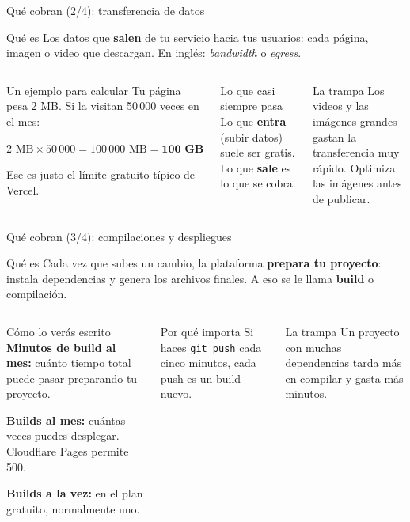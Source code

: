 \documentclass[aspectratio=169,10pt,c]{beamer}
\begin{document}
\begin{frame}{Qué cobran (2/4): transferencia de datos}
\begin{block}{Qué es}
\small Los datos que \textbf{salen} de tu servicio hacia tus usuarios: cada página, imagen o video que descargan. En inglés: \emph{bandwidth} o \emph{egress}.
\end{block}
\begin{columns}[T,onlytextwidth]
\begin{exampleblock}{Un ejemplo para calcular}
\small Tu página pesa 2 MB. Si la visitan 50\,000 veces en el mes:\par\smallskip
$2 \text{ MB} \times 50\,000 = 100\,000 \text{ MB} = \mathbf{100 \text{ GB}}$\par\smallskip
Ese es justo el límite gratuito típico de Vercel.
\end{exampleblock}
\begin{block}{Lo que casi siempre pasa}
\small Lo que \textbf{entra} (subir datos) suele ser gratis. Lo que \textbf{sale} es lo que se cobra.
\end{block}
\begin{alertblock}{La trampa}
\small Los videos y las imágenes grandes gastan la transferencia muy rápido. Optimiza las imágenes antes de publicar.
\end{alertblock}
\end{columns}
\end{frame}

\begin{frame}{Qué cobran (3/4): compilaciones y despliegues}
\begin{block}{Qué es}
\small Cada vez que subes un cambio, la plataforma \textbf{prepara tu proyecto}: instala dependencias y genera los archivos finales. A eso se le llama \textbf{build} o compilación.
\end{block}
\begin{columns}[T,onlytextwidth]
\begin{exampleblock}{Cómo lo verás escrito}
\small
\textbf{Minutos de build al mes:} cuánto tiempo total puede pasar preparando tu proyecto.\par\smallskip
\textbf{Builds al mes:} cuántas veces puedes desplegar. Cloudflare Pages permite 500.\par\smallskip
\textbf{Builds a la vez:} en el plan gratuito, normalmente uno.
\end{exampleblock}
\begin{block}{Por qué importa}
\small Si haces \texttt{git push} cada cinco minutos, cada push es un build nuevo.
\end{block}
\begin{alertblock}{La trampa}
\small Un proyecto con muchas dependencias tarda más en compilar y gasta más minutos.
\end{alertblock}
\end{columns}
\end{frame}
\end{document}
